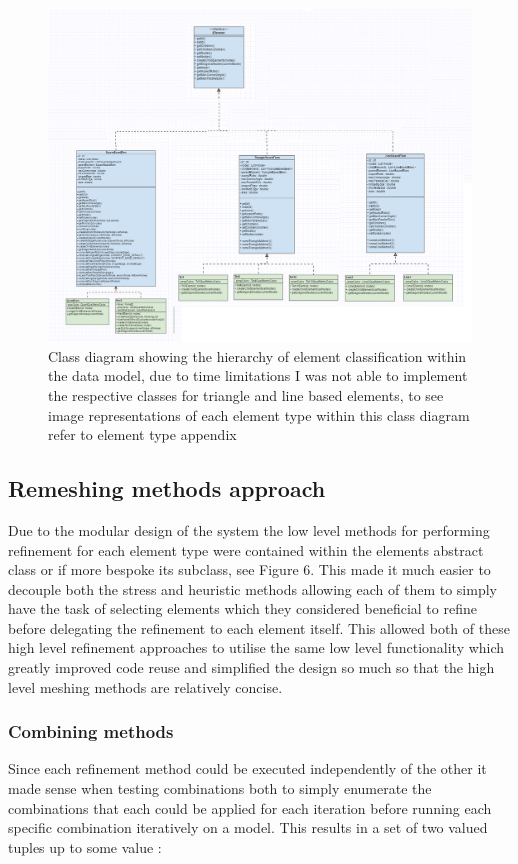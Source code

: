 \begin{figure}[!h]                                                   
  \centerline{\includegraphics[width=150mm, scale=1]{../Graphics/ElementHigerarchyDiagram2.png}}
  \caption{Class diagram showing the hierarchy of element classification within the data model, due to time limitations I was not able to implement the respective classes for triangle and line based elements, to see image representations of each element type within this class diagram refer to element type appendix}
  \label{fig:h-refinementImp}
\end{figure}


\subsection{Remeshing methods approach}
Due to the modular design of the system the low level methods for performing refinement for each element type were contained within the elements abstract class or if more bespoke its subclass, see Figure 6. This made it much easier to decouple both the stress and heuristic methods allowing each of them to simply have the task of selecting elements which they considered beneficial to refine before delegating the refinement to each element itself. This allowed both of these high level refinement approaches to utilise the same low level functionality which greatly improved code reuse and simplified the design so much so that the high level meshing methods are relatively concise.

\subsubsection{Combining methods}
Since each refinement method could be executed independently of the other it made sense when testing combinations both to simply enumerate the combinations that each could be applied for each iteration before running each specific combination iteratively on a model. This results in a set of two valued tuples up to some value :


